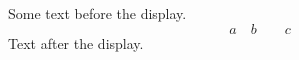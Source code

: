 \documentclass[12pt]{article}
\begin{document}
Some text before the display.
\[ a \quad b \qquad c \]
Text after the display.
\end{document}
